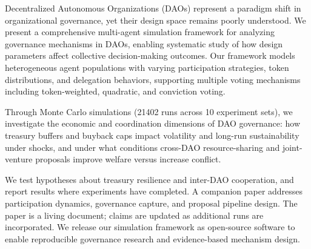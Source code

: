 
Decentralized Autonomous Organizations (DAOs) represent a paradigm shift in organizational governance, yet their design space remains poorly understood. We present a comprehensive multi-agent simulation framework for analyzing governance mechanisms in DAOs, enabling systematic study of how design parameters affect collective decision-making outcomes. Our framework models heterogeneous agent populations with varying participation strategies, token distributions, and delegation behaviors, supporting multiple voting mechanisms including token-weighted, quadratic, and conviction voting.

Through Monte Carlo simulations (21402 runs across 10 experiment sets), we investigate the economic and coordination dimensions of DAO governance: how treasury buffers and buyback caps impact volatility and long-run sustainability under shocks, and under what conditions cross-DAO resource-sharing and joint-venture proposals improve welfare versus increase conflict.

We test hypotheses about treasury resilience and inter-DAO cooperation, and report results where experiments have completed. A companion paper addresses participation dynamics, governance capture, and proposal pipeline design. The paper is a living document; claims are updated as additional runs are incorporated. We release our simulation framework as open-source software to enable reproducible governance research and evidence-based mechanism design.

